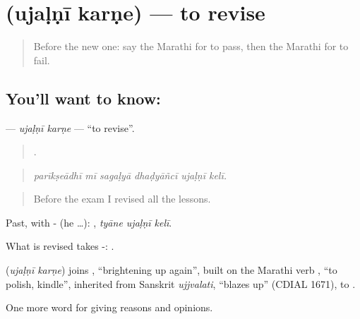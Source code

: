 \section[\texorpdfstring{\mr{उजळणी} \mr{करणे} (ujaḷṇī karṇe)}{उजळणी करणे (ujaḷṇī karṇe)}]{  (ujaḷṇī karṇe) — to revise}

\label{lesson:MR-C371-ujalni-karne}



\begin{quote}
Before the new one: say the Marathi for to pass, then the Marathi for to fail.
\end{quote}

\subsection*{You'll want to know:  }
\textbf{ } — \emph{ujaḷṇī karṇe} — \textquotedblleft{}to revise\textquotedblright{}.

\begin{quote}
     .
\end{quote}

\begin{quote}
\emph{parīkṣeādhī mī sagaḷyā dhaḍyāñcī ujaḷṇī kelī.}
\end{quote}

\begin{quote}
Before the exam I revised all the lessons.
\end{quote}

Past, with - (he …):   , \emph{tyāne ujaḷṇī kelī}.

What is revised takes -:  .

\begin{cousinweb}
\textbf{ } (\emph{ujaḷṇī karṇe}) joins , \textquotedblleft{}brightening up again\textquotedblright{}, built on the Marathi verb , \textquotedblleft{}to polish, kindle\textquotedblright{}, inherited from Sanskrit \emph{ujjvalati}, \textquotedblleft{}blazes up\textquotedblright{} (CDIAL 1671), to .
\end{cousinweb}

\begin{grammarlens}[title={What you've built}]
One more word for giving reasons and opinions.
\end{grammarlens}

